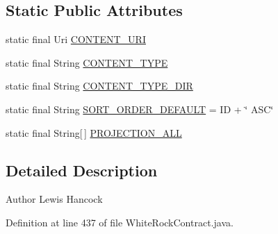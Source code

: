 \subsection*{Static Public Attributes}
\begin{DoxyCompactItemize}
\item 
static final Uri \hyperlink{classuk_1_1ac_1_1swan_1_1digitaltrails_1_1database_1_1_white_rock_contract_1_1_waypoint_with_english_description_a3616ae0f5d9b135152da97580a7bc850}{C\+O\+N\+T\+E\+N\+T\+\_\+\+U\+R\+I}
\item 
static final String \hyperlink{classuk_1_1ac_1_1swan_1_1digitaltrails_1_1database_1_1_white_rock_contract_1_1_waypoint_with_english_description_affea3241f7907de53fa9d67901a39f2d}{C\+O\+N\+T\+E\+N\+T\+\_\+\+T\+Y\+P\+E}
\item 
static final String \hyperlink{classuk_1_1ac_1_1swan_1_1digitaltrails_1_1database_1_1_white_rock_contract_1_1_waypoint_with_english_description_abf258bdb2c5f9732f2cbd9746ba693f0}{C\+O\+N\+T\+E\+N\+T\+\_\+\+T\+Y\+P\+E\+\_\+\+D\+I\+R}
\item 
static final String \hyperlink{classuk_1_1ac_1_1swan_1_1digitaltrails_1_1database_1_1_white_rock_contract_1_1_waypoint_with_english_description_a43f80ce8328046e60bb9bd878a0ee547}{S\+O\+R\+T\+\_\+\+O\+R\+D\+E\+R\+\_\+\+D\+E\+F\+A\+U\+L\+T} = I\+D + \char`\"{} A\+S\+C\char`\"{}
\item 
static final String\mbox{[}$\,$\mbox{]} \hyperlink{classuk_1_1ac_1_1swan_1_1digitaltrails_1_1database_1_1_white_rock_contract_1_1_waypoint_with_english_description_a0297afc392d4349db3bc3c5a57f9659a}{P\+R\+O\+J\+E\+C\+T\+I\+O\+N\+\_\+\+A\+L\+L}
\end{DoxyCompactItemize}


\subsection{Detailed Description}
\begin{DoxyAuthor}{Author}
Lewis Hancock 
\end{DoxyAuthor}


Definition at line 437 of file White\+Rock\+Contract.\+java.



